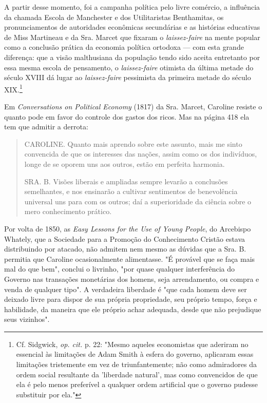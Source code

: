 \documentclass[12pt]{article}
\begin{document}
A partir desse momento, foi a campanha política pelo livre comércio, a influência da chamada Escola de Manchester e dos Utilitaristas Benthamitas, os pronunciamentos de autoridades econômicas secundárias e as histórias educativas de Miss Martineau e da Sra. Marcet que fixaram o \textit{laissez-faire} na mente popular como a conclusão prática da economia política ortodoxa — com esta grande diferença: que a visão malthusiana da população tendo sido aceita entretanto por essa mesma escola de pensamento, o \textit{laissez-faire} otimista da última metade do século XVIII dá lugar ao \textit{laissez-faire} pessimista da primeira metade do século XIX.\footnote{Cf. Sidgwick, \textit{op. cit.} p. 22: "Mesmo aqueles economistas que aderiram no essencial às limitações de Adam Smith à esfera do governo, aplicaram essas limitações tristemente em vez de triunfantemente; não como admiradores da ordem social resultante da 'liberdade natural', mas como convencidos de que ela é pelo menos preferível a qualquer ordem artificial que o governo pudesse substituir por ela."}

Em \textit{Conversations on Political Economy} (1817) da Sra. Marcet, Caroline resiste o quanto pode em favor do controle dos gastos dos ricos. Mas na página 418 ela tem que admitir a derrota:

\begin{quote}
CAROLINE. Quanto mais aprendo sobre este assunto, mais me sinto convencida de que os interesses das nações, assim como os dos indivíduos, longe de se oporem uns aos outros, estão em perfeita harmonia.

SRA. B. Visões liberais e ampliadas sempre levarão a conclusões semelhantes, e nos ensinarão a cultivar sentimentos de benevolência universal uns para com os outros; daí a superioridade da ciência sobre o mero conhecimento prático.
\end{quote}

Por volta de 1850, as \textit{Easy Lessons for the Use of Young People}, do Arcebispo Whately, que a Sociedade para a Promoção do Conhecimento Cristão estava distribuindo por atacado, não admitem nem mesmo as dúvidas que a Sra. B. permitia que Caroline ocasionalmente alimentasse. "É provável que se faça mais mal do que bem", conclui o livrinho, "por quase qualquer interferência do Governo nas transações monetárias dos homens, seja arrendamento, ou compra e venda de qualquer tipo". A verdadeira liberdade é "que cada homem deve ser deixado livre para dispor de sua própria propriedade, seu próprio tempo, força e habilidade, da maneira que ele próprio achar adequada, desde que não prejudique seus vizinhos".
\end{document}
